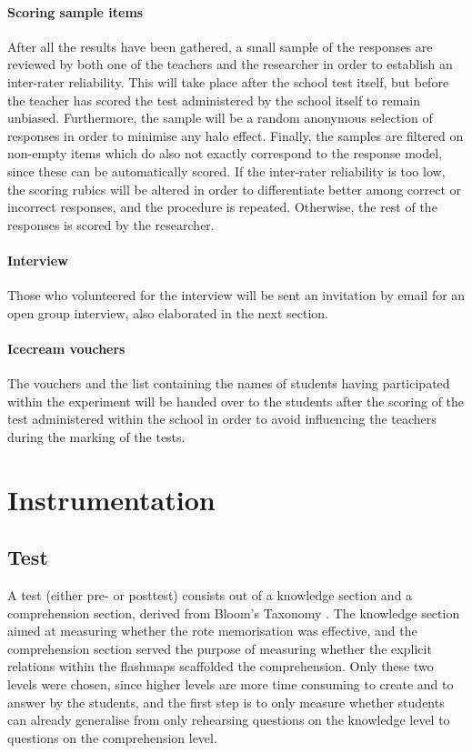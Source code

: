 \paragraph{Scoring sample items} After all the results have been gathered, a small sample of the responses are reviewed by both one of the teachers and the researcher in order to establish an inter-rater reliability. This will take place after the school test itself, but before the teacher has scored the test administered by the school itself to remain unbiased. Furthermore, the sample will be a random anonymous selection of responses in order to minimise any halo effect. Finally, the samples are filtered on non-empty items which do also not exactly correspond to the response model, since these can be automatically scored. If the inter-rater reliability is too low, the scoring rubics will be altered in order to differentiate better among correct or incorrect responses, and the procedure is repeated. Otherwise, the rest of the responses is scored by the researcher.

\paragraph{Interview} Those who volunteered for the interview will be sent an invitation by email for an open group interview, also elaborated in the next section.

\paragraph{Icecream vouchers} The vouchers and the list containing the names of students having participated within the experiment will be handed over to the students after the scoring of the test administered within the school in order to avoid influencing the teachers during the marking of the tests.

\section{Instrumentation}
\label{sec:instrumentation}

\subsection{Test}

A test (either pre- or posttest) consists out of a knowledge section and a comprehension section, derived from Bloom's Taxonomy \cite{bloom}. The knowledge section aimed at measuring whether the rote memorisation was effective, and the comprehension section served the purpose of measuring whether the explicit relations within the flashmaps scaffolded the comprehension. Only these two levels were chosen, since higher levels are more time consuming to create and to answer by the students, and the first step is to only measure whether students can already generalise from only rehearsing questions on the knowledge level to questions on the comprehension level.

